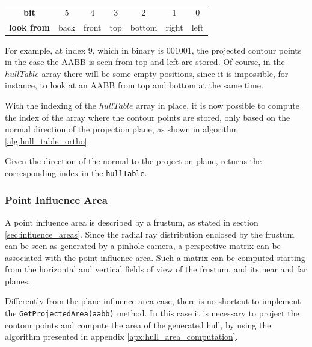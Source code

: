 \documentclass[acmtog, anonymous, review]{acmart}
\begin{document}
\begin{tabular}{| c | c | c | c | c | c | c |}
	\hline
	\textbf{bit} & 5 & 4 & 3 & 2 & 1 & 0 \\
	\textbf{look from} & back & front & top & bottom & right & left \\
	\hline
\end{tabular}

For example, at index $9$, which in binary is $001001$, the projected contour points in the case the AABB is seen from top and left are stored. Of course, in the $hullTable$ array there will be some empty positions, since it is impossible, for instance, to look at an AABB from top and bottom at the same time.

With the indexing of the $hullTable$ array in place, it is now possible to compute the index of the array where the contour points are stored, only based on the normal direction of the projection plane, as shown in algorithm \ref{alg:hull_table_ortho}.

\begin{algorithm}
	\caption{Given the direction of the normal to the projection plane, returns the corresponding index in the \texttt{hullTable}.}
  \label{alg:hull_table_ortho}
  \DontPrintSemicolon
\end{algorithm} 

\subsubsection{Point Influence Area}
A point influence area is described by a frustum, as stated in section \ref{sec:influence_areas}. Since the radial ray distribution enclosed by the frustum can be seen as generated by a pinhole camera, a perspective matrix can be associated with the point influence area. Such a matrix can be computed starting from the horizontal and vertical fields of view of the frustum, and its near and far planes.

Differently from the plane influence area case, there is no shortcut to implement the \texttt{GetProjectedArea(aabb)} method. In this case it is necessary to project the contour points and compute the area of the generated hull, by using the algorithm presented in appendix \ref{apx:hull_area_computation}.
\end{document}
